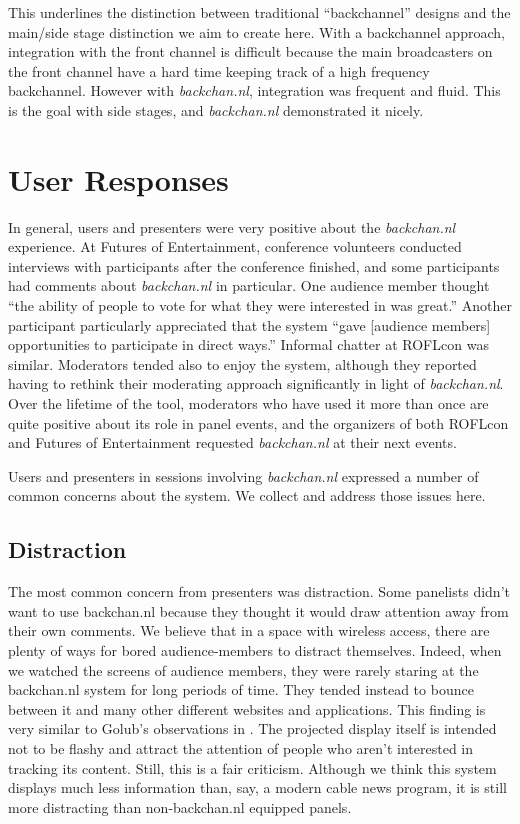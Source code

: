 This underlines the distinction between traditional ``backchannel'' designs and the main/side stage distinction we aim to create here. With a backchannel approach, integration with the front channel is difficult because the main broadcasters on the front channel have a hard time keeping track of a high frequency backchannel. However with \emph{backchan.nl}, integration was frequent and fluid. This is the goal with side stages, and \emph{backchan.nl} demonstrated it nicely.

\section{User Responses}

In general, users and presenters were very positive about the \emph{backchan.nl} experience. At Futures of Entertainment, conference volunteers conducted interviews with participants after the conference finished, and some participants had comments about \emph{backchan.nl} in particular. One audience member thought ``the ability of people to vote for what they were interested in was great.'' Another participant particularly appreciated that the system ``gave [audience members] opportunities to participate in direct ways.'' Informal chatter at ROFLcon was similar. Moderators tended also to enjoy the system, although they reported having to rethink their moderating approach significantly in light of \emph{backchan.nl}. Over the lifetime of the tool, moderators who have used it more than once are quite positive about its role in panel events, and the organizers of both ROFLcon and Futures of Entertainment requested \emph{backchan.nl} at their next events.

Users and presenters in sessions involving \emph{backchan.nl} expressed a number of common concerns about the system. We collect and address those issues here.


\subsection{Distraction}
The most common concern from presenters was distraction. Some panelists didn't want to use backchan.nl because they thought it would draw attention away from their own comments. We believe that in a space with wireless access, there are plenty of ways for bored audience-members to distract themselves. Indeed, when we watched the screens of audience members, they were rarely staring at the backchan.nl system for long periods of time. They tended instead to bounce between it and many other different websites and applications. This finding is very similar to Golub's observations in \citep{Golub:2005ws}. The projected display itself is intended not to be flashy and attract the attention of people who aren't interested in tracking its content. Still, this is a fair criticism. Although we think this system displays much less information than, say, a modern cable news program, it is still more distracting than non-backchan.nl equipped panels.


